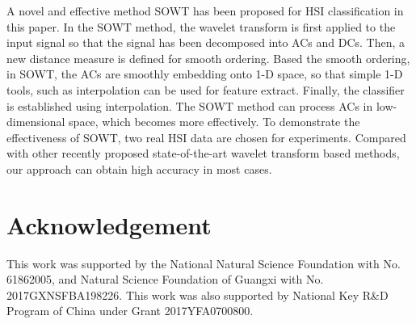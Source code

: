 \documentclass{ws-ijwmip}
\begin{document}
A novel and effective method SOWT has been proposed for HSI classification in this paper. In the SOWT method, the wavelet transform is first applied to the input signal so that the signal has been decomposed into ACs and DCs. Then, a new distance measure is defined for smooth ordering. Based the smooth ordering, in SOWT, the ACs are smoothly embedding onto 1-D space, so that simple 1-D tools, such as interpolation can be used for feature extract. Finally, the classifier is established using interpolation. The SOWT method can process ACs in low-dimensional space, which becomes more effectively. To demonstrate the effectiveness of SOWT, two real HSI data are chosen for experiments. Compared with other recently proposed state-of-the-art wavelet transform based methods, our approach can obtain high accuracy in most cases.

\section{Acknowledgement}
This work was supported by the National Natural Science Foundation with No. 61862005, and Natural Science Foundation of Guangxi with No. 2017GXNSFBA198226.
This work was also supported by National Key R\&D Program of China under Grant 2017YFA0700800.






\end{document}
